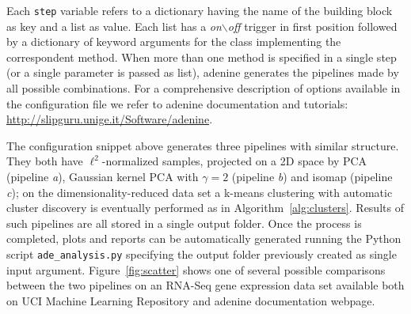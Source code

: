 \documentclass[twoside,11pt]{article}
\makeatletter
\newcommand{\ade}{{\sc adenine}\@\xspace}
\newcommand{\py}{{Python}\@\xspace}
\makeatother
\begin{document}
\noindent Each \texttt{step} variable refers to a dictionary having the name of the building block as key and a {list} as value. Each list has a \emph{on$\backslash$off} trigger in first position followed by a dictionary of keyword arguments for the class implementing the correspondent method. When more than one method is specified in a single step (or a single parameter is passed as {list}), \ade generates the pipelines made by all possible combinations.
For a comprehensive description of options available in the configuration file we refer to \ade documentation and tutorials: {\small\url{http://slipguru.unige.it/Software/adenine}}.

The configuration snippet above generates three pipelines with similar structure. They both have $\ell^2$-normalized samples, projected on a 2D space by PCA (pipeline \textit{a}), Gaussian kernel PCA with $\gamma=2$ (pipeline \textit{b}) and isomap (pipeline \textit{c}); on the dimensionality-reduced data set a k-means clustering with automatic cluster discovery is eventually performed as in Algorithm~\ref{alg:clusters}.
Results of such pipelines are all stored in a single output folder. Once the process is completed, plots and reports can be automatically generated running the \py script \texttt{ade\_analysis.py} specifying the output folder previously created as single input argument. Figure~\ref{fig:scatter} shows one of several possible comparisons between the two pipelines on an RNA-Seq gene expression data set available both on UCI Machine Learning Repository and
\ade documentation webpage.
\end{document}
